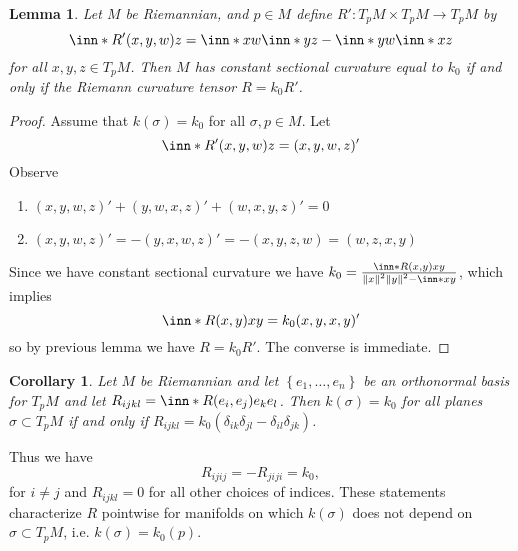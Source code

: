 \documentclass[a4paper]{article}
\newtheorem*{cor}{Corollary}
\newtheorem*{lem}{Lemma}
\begin{document}
\begin{lem}
  Let $M$ be Riemannian, and $p \in M$ define $R': T_pM \times T_pM \rightarrow T_pM$ by
  \[
    \inn*{R'(x,y,w)}{z} = \inn*{x}{w}\inn*{y}{z} - \inn*{y}{w}\inn*{x}{z}
  \]
  for all $x,y,z \in T_pM$. Then $M$ has constant sectional curvature equal to $k_0$ if and only if the Riemann curvature tensor $R = k_0 R'$.
\end{lem}

\begin{proof}
  Assume that $k(\sigma) = k_0$ for all $\sigma, p \in M$. Let 
  \[
    \inn*{R'(x,y,w)}{z} = (x,y,w,z)'
  \]
  Observe 
  \begin{enumerate}
    \item $(x,y,w,z)' + (y,w,x,z)' + (w,x,y,z)' = 0$
    \item $(x,y,w,z)' = -(y,x,w,z)' = -(x,y,z,w) = (w,z,x,y)$ 
  \end{enumerate}
  Since we have constant sectional curvature we have $k_0 = \frac{\inn*{R(x,y)x}{y}}{\norm{x}^2\norm{y}^2 - \inn*{x}{y}}$, which implies
  \[
    \inn*{R(x,y)x}{y} = k_0 (x,y,x,y)'
  \]
  so by previous lemma we have $R = k_0R'$. The converse is immediate.
\end{proof}

\begin{cor}
  Let $M$ be Riemannian and let $\left\{ e_1, \dots, e_n \right\}$ be an orthonormal basis for $T_pM$ and let $R_{ijkl} = \inn*{R(e_i,e_j) e_k}{e_l}$. Then $k(\sigma) = k_0$ for all planes $\sigma \subset T_pM$ if and only if $R_{ijkl} = k_0(\delta_{ik}\delta_{jl} - \delta_{il}\delta_{jk})$. 
\end{cor}
Thus we have
\[
  R_{ijij} = -R_{jiji} = k_0,
\]
for $i \neq j$ and $R_{ijkl} = 0$ for all other choices of indices. These statements characterize $R$ pointwise for manifolds on which $k(\sigma)$ does  not depend on $\sigma \subset T_pM$, i.e. $k(\sigma) = k_0(p)$. 
\end{document}
